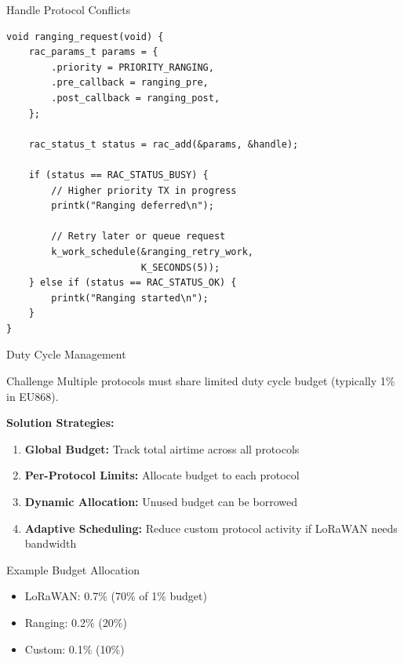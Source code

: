 \documentclass{beamer}
\begin{document}
\begin{frame}[fragile]{Handle Protocol Conflicts}
\begin{lstlisting}[caption={Conflict Resolution}]
void ranging_request(void) {
    rac_params_t params = {
        .priority = PRIORITY_RANGING,
        .pre_callback = ranging_pre,
        .post_callback = ranging_post,
    };

    rac_status_t status = rac_add(&params, &handle);

    if (status == RAC_STATUS_BUSY) {
        // Higher priority TX in progress
        printk("Ranging deferred\n");

        // Retry later or queue request
        k_work_schedule(&ranging_retry_work,
                        K_SECONDS(5));
    } else if (status == RAC_STATUS_OK) {
        printk("Ranging started\n");
    }
}
\end{lstlisting}
\end{frame}

\begin{frame}{Duty Cycle Management}
\begin{block}{Challenge}
Multiple protocols must share limited duty cycle budget (typically 1\% in EU868).
\end{block}

\vspace{0.3cm}

\textbf{Solution Strategies:}
\begin{enumerate}
    \item \textbf{Global Budget:} Track total airtime across all protocols
    \item \textbf{Per-Protocol Limits:} Allocate budget to each protocol
    \item \textbf{Dynamic Allocation:} Unused budget can be borrowed
    \item \textbf{Adaptive Scheduling:} Reduce custom protocol activity if LoRaWAN needs bandwidth
\end{enumerate}

\vspace{0.3cm}

\begin{alertblock}{Example Budget Allocation}
\begin{itemize}
    \item LoRaWAN: 0.7\% (70\% of 1\% budget)
    \item Ranging: 0.2\% (20\%)
    \item Custom: 0.1\% (10\%)
\end{itemize}
\end{alertblock}
\end{frame}
\end{document}

